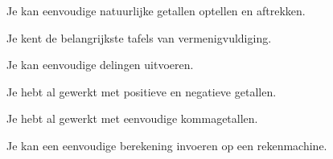 \documentclass{ximera}
\begin{document}
\maketitle



\begin{voorkennis}

    \item Je kan eenvoudige natuurlijke getallen optellen en aftrekken.

    \item Je kent de belangrijkste tafels van vermenigvuldiging.

    \item Je kan eenvoudige delingen uitvoeren.

    \item Je hebt al gewerkt met positieve en negatieve getallen.

    \item Je hebt al gewerkt met eenvoudige kommagetallen.

    \item Je kan een eenvoudige berekening invoeren op een rekenmachine.

\end{voorkennis}


\end{document}
